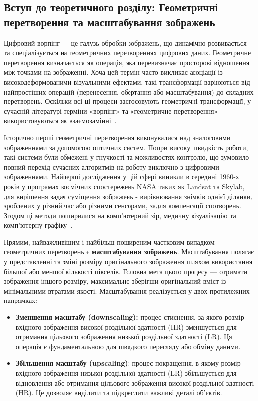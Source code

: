 \subsection{Вступ до теоретичного розділу: Геометричні перетворення та масштабування зображень}

Цифровий ворпінг — це галузь обробки зображень, що динамічно розвивається та спеціалізується на геометричних перетвореннях цифрових даних. Геометричне перетворення визначається як операція, яка перевизначає просторові відношення між точками на зображенні. Хоча цей термін часто викликає асоціації із високодеформованими візуальними ефектами, такі трансформації варіюються від найпростіших операцій (перенесення, обертання або масштабування) до складних перетворень. Оскільки всі ці процеси застосовують геометричні трансформації, у сучасній літературі терміни «ворпінг» та «геометричне перетворення» використовуються як взаємозамінні~\cite{wolberg1992digital}. 

Історично перші геометричні перетворення виконувалися над аналоговими зображеннями за допомогою оптичних систем. Попри високу швидкість роботи, такі системи були обмежені у гнучкості та можливостях контролю, що зумовило повний перехід сучасних алгоритмів на роботу виключно з цифровими зображеннями. Найперші дослідження у цій сфері виникли в середині 1960-х років у програмах космічних спостережень NASA таких як Landsat та Skylab, для вирішення задач суміщення зображень - вирівнювання знімків однієї ділянки, зроблених у різний час або різними сенсорами, задля компенсації спотворень. Згодом ці методи поширилися на комп'ютерний зір, медичну візуалізацію та комп'ютерну графіку~\cite{wolberg1992digital}.

Прямим, найважливішим і найбільш поширеним частковим випадком геометричних перетворень є \textbf{масштабування зображень}. Масштабування полягає у представленні та зміні розміру оригінального зображення шляхом використання більшої або меншої кількості пікселів. Головна мета цього процесу — отримати зображення іншого розміру, максимально зберігши оригінальний вміст із мінімальними втратами якості. Масштабування реалізується у двох протилежних напрямках:
\newpage
\begin{itemize}
	\item \textbf{Зменшення масштабу (downscaling):} процес стиснення, за якого розмір вхідного зображення високої роздільної здатності (HR) зменшується для отримання цільового зображення низької роздільної здатності (LR). Ця операція є фундаментальною для швидкого перегляду або обміну даними.
	\item \textbf{Збільшення масштабу (upscaling):} процес покращення, в якому розмір вхідного зображення низької роздільної здатності (LR) збільшується для відновлення або отримання цільового зображення високої роздільної здатності (HR). Це дозволяє виділити та підкреслити важливі деталі об'єктів.
\end{itemize}

